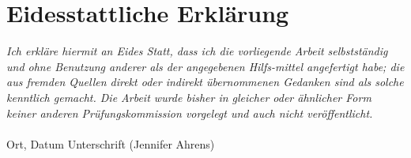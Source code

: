 \clearpage
\section*{Eidesstattliche Erklärung}
\emph{Ich erkläre hiermit an Eides Statt, dass ich die vorliegende Arbeit selbstständig und ohne Benutzung anderer als der angegebenen Hilfs-mittel angefertigt habe; die aus fremden Quellen direkt oder indirekt übernommenen Gedanken sind als solche kenntlich gemacht.
Die Arbeit wurde bisher in gleicher oder ähnlicher Form keiner anderen Prüfungskommission vorgelegt und auch nicht veröffentlicht.}
\\
\\

Ort, Datum \hfill Unterschrift (Jennifer Ahrens)
